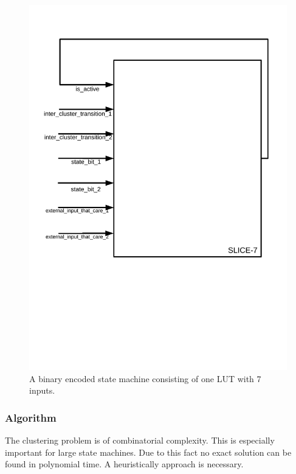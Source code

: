 \begin{figure}
	\centering
	\includegraphics[scale=0.65, trim=400 250 400 97] {images/slice7.pdf}
	\caption{A binary encoded state machine consisting of one LUT with 7 inputs.}
	\label{img:slice7}
\end{figure}




\subsubsection{Algorithm}
\label{subsubsec:algo}

The clustering problem is of combinatorial complexity. This is especially important for large state machines.
Due to this fact no exact solution can be found in polynomial time. A heuristically approach is necessary. \\

